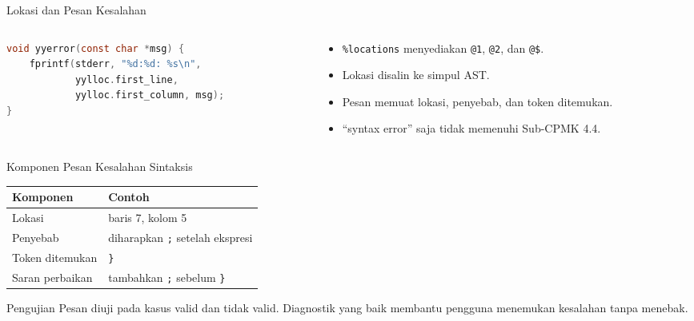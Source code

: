 \documentclass[aspectratio=169,10pt,t]{beamer}
\begin{document}
\begin{frame}[fragile]{Lokasi dan Pesan Kesalahan}
  \begin{columns}[T,onlytextwidth]
    \begin{column}{0.52\textwidth}
      \begin{lstlisting}[language=C,numbers=none,
        caption={Fungsi \texttt{yyerror} dengan lokasi}]
void yyerror(const char *msg) {
    fprintf(stderr, "%d:%d: %s\n",
            yylloc.first_line,
            yylloc.first_column, msg);
}
      \end{lstlisting}
    \end{column}
    \begin{column}{0.44\textwidth}
      \begin{itemize}
        \item \texttt{\%locations} menyediakan \texttt{@1}, \texttt{@2},
              dan \texttt{@\$}.
        \item Lokasi disalin ke simpul AST.
        \item Pesan memuat lokasi, penyebab, dan token ditemukan.
        \item ``syntax error'' saja tidak memenuhi Sub-CPMK 4.4.
      \end{itemize}
    \end{column}
  \end{columns}
\end{frame}

\begin{frame}{Komponen Pesan Kesalahan Sintaksis}
  \small
  \setlength{\tabcolsep}{4pt}
  \begin{tabular}{@{}p{3.2cm}p{10.2cm}@{}}
    \toprule
    \textbf{Komponen} & \textbf{Contoh} \\
    \midrule
    Lokasi & baris 7, kolom 5 \\
    Penyebab & diharapkan \texttt{;} setelah ekspresi \\
    Token ditemukan & \texttt{\}} \\
    Saran perbaikan & tambahkan \texttt{;} sebelum \texttt{\}} \\
    \bottomrule
  \end{tabular}

  \vspace{5pt}
  \begin{block}{Pengujian}
    \footnotesize
    Pesan diuji pada kasus valid dan tidak valid. Diagnostik yang baik
    membantu pengguna menemukan kesalahan tanpa menebak.
  \end{block}
\end{frame}
\end{document}
